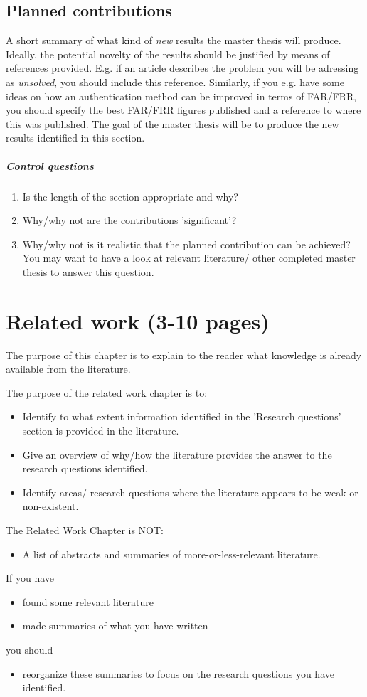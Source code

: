 \documentclass[gjovik]{gucmasterproject}
\begin{document}
\section{Planned contributions}
A short summary of what kind of {\em new} results the master thesis will produce.  
Ideally,  the potential novelty of the results should be justified by means of references provided.
E.g. if an article describes the problem you will be adressing as {\em unsolved},
you should include this reference.  Similarly, if you e.g. have some ideas on how an 
authentication method can be improved in terms of FAR/FRR, you should specify the best
 FAR/FRR figures published and a reference to where this was published. 
 The goal of the master thesis
will be to produce the new results identified in this section.

\paragraph{Control questions}
\begin{enumerate}
\item Is the length of the section appropriate and why?
\item Why/why not are the contributions 'significant'?
\item Why/why not is it realistic that the planned contribution can be achieved?  You may want to have a look at relevant literature/ other completed master thesis to answer this question.
\end{enumerate}

\chapter{Related work (3-10 pages)}
The purpose of this chapter
is to explain to the reader what knowledge is already
available from the literature.

The purpose of the related work chapter is to:
\begin{itemize}
\item Identify to what extent information identified in the 'Research questions'  section is provided in the literature.
\item Give an overview of why/how the literature provides the answer to the research questions identified.
\item Identify areas/ research questions where the literature appears to be weak or non-existent.
\end{itemize}
The Related Work Chapter is NOT:
\begin{itemize}
\item   A list of abstracts and summaries of more-or-less-relevant literature.
\end{itemize}
If you have
\begin{itemize}
\item   found some relevant literature
\item   made summaries of what you have written
\end{itemize}
you should
\begin{itemize}
\item reorganize these summaries to focus on the research questions you have identified.
\end{itemize}
\end{document}
